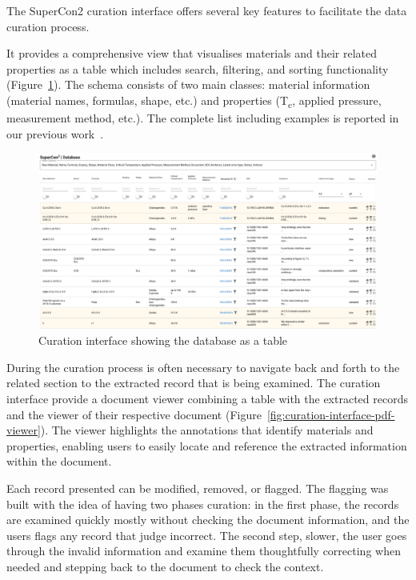 \documentclass{article}
\begin{document}
The SuperCon2 curation interface offers several key features to facilitate the data curation process.

It provides a comprehensive view that visualises materials and their related properties as a table which includes search, filtering, and sorting functionality (Figure~\ref{fig:curation-interface-database}). 
The schema consists of two main classes: material information (material names, formulas, shape, etc.) and properties (T\textsubscript{c}, applied pressure, measurement method, etc.). The complete list including examples is reported in our previous work~\cite{lfoppiano2023automatic}.

\begin{figure}[t]
  \centering
  \includegraphics[width=1\textwidth]{images/supercon-curation-database} 
  \caption{Curation interface showing the database as a table}
  \label{fig:curation-interface-database}
\end{figure}


During the curation process is often necessary to navigate back and forth to the related section to the extracted record that is being examined. The curation interface provide a document viewer combining a table with the extracted records and the viewer of their respective document (Figure~\ref{fig:curation-interface-pdf-viewer}). The viewer highlights the annotations that identify materials and properties, enabling users to easily locate and reference the extracted information within the document.

Each record presented can be modified, removed, or flagged. The flagging was built with the idea of having two phases curation: in the first phase, the records are examined quickly mostly without checking the document information, and the users flags any record that judge incorrect. The second step, slower, the user goes through the invalid information and examine them thoughtfully correcting when needed and stepping back to the document to check the context. 
\end{document}
